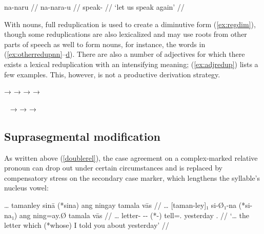 \a\label{ex:hort+iter}\begingl
	\gla na-naru //
	\glb na-nara-u //
	\glc \Iter{}\til{}speak-\Imp{} //
	\glft `let us speak again' //
\endgl

\xe

With nouns, full reduplication is used to create a diminutive 
form (\ref{ex:regdim}), though some reduplications are also lexicalized and 
may use roots from other parts of speech as well to form nouns, for instance, 
the words in (\ref{ex:otherredupnn}--\hyperref[ex:otherredupvb]{d}). There are 
also a number of adjectives for which there exists a lexical reduplication with 
an intensifying meaning; (\ref{ex:adjredup}) lists a few examples. This, 
however, is not a productive derivation strategy.

\pex
	\a {} →  \label{ex:regdim}
	\a {} →  
		\label{ex:otherredupnn}
	\a {} → 
		 \label{ex:otherredupadj}
	\a {} →  
		\label{ex:otherredupvb}
\xe

\pex~\label{ex:adjredup}
	\a {} → 
	\a {} → 
	\a {} → 
\xe


\subsection{Suprasegmental modification}

As written above (\autoref{doublerel}), the case agreement on a complex-marked 
relative pronoun can drop out under certain 
circumstances and is replaced by compensatory stress on the secondary case 
marker, which lengthens the syllable's nucleus vowel:

\ex\begingl
	\gla … tamanley sinā (*sina) ang ningay tamala vās //
	\glb … [taman-ley]₁ si-Ø₁-na (*si-na₁) ang ning=ay.Ø tamala vās //
	\glc … letter-\PargI{} \Rel{}-\PatTI{}-\Gen{} (*\Rel{}-\Gen{}) \AgtT{} 
		tell=\Fsg{}.\Top{} yesterday \Ssg{}.\Parg{} //
	\glft `… the letter which (*whose) I told you about yesterday' //
\endgl\xe


